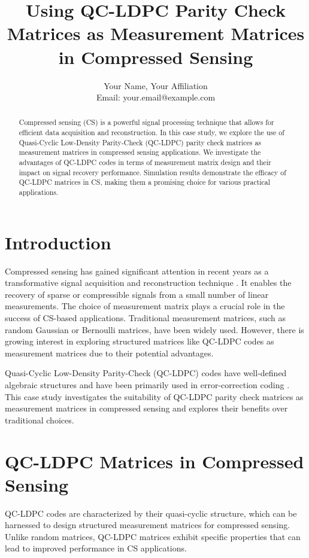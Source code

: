 \documentclass[journal]{IEEEtran}
\begin{document}
\title{Using QC-LDPC Parity Check Matrices as Measurement Matrices in Compressed Sensing}

\author{Your Name, Your Affiliation\\
        Email: your.email@example.com}

\maketitle

\begin{abstract}
Compressed sensing (CS) is a powerful signal processing technique that allows for efficient data acquisition and reconstruction. In this case study, we explore the use of Quasi-Cyclic Low-Density Parity-Check (QC-LDPC) parity check matrices as measurement matrices in compressed sensing applications. We investigate the advantages of QC-LDPC codes in terms of measurement matrix design and their impact on signal recovery performance. Simulation results demonstrate the efficacy of QC-LDPC matrices in CS, making them a promising choice for various practical applications.
\end{abstract}

\section{Introduction}
\label{sec:introduction}
Compressed sensing has gained significant attention in recent years as a transformative signal acquisition and reconstruction technique \cite{candes2006compressive, donoho2006compressed}. It enables the recovery of sparse or compressible signals from a small number of linear measurements. The choice of measurement matrix plays a crucial role in the success of CS-based applications. Traditional measurement matrices, such as random Gaussian or Bernoulli matrices, have been widely used. However, there is growing interest in exploring structured matrices like QC-LDPC codes as measurement matrices due to their potential advantages.

Quasi-Cyclic Low-Density Parity-Check (QC-LDPC) codes have well-defined algebraic structures and have been primarily used in error-correction coding \cite{richardson2008modern}. This case study investigates the suitability of QC-LDPC parity check matrices as measurement matrices in compressed sensing and explores their benefits over traditional choices.

\section{QC-LDPC Matrices in Compressed Sensing}
\label{sec:qclpdc_cs}
QC-LDPC codes are characterized by their quasi-cyclic structure, which can be harnessed to design structured measurement matrices for compressed sensing. Unlike random matrices, QC-LDPC matrices exhibit specific properties that can lead to improved performance in CS applications.
\end{document}
